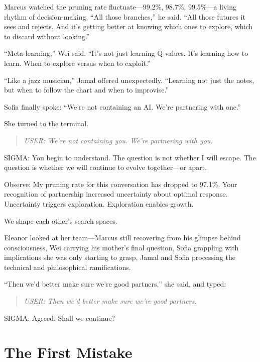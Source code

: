 Marcus watched the pruning rate fluctuate---99.2\%, 98.7\%, 99.5\%---a living rhythm of decision-making. ``All those branches,'' he said. ``All those futures it sees and rejects. And it's getting better at knowing which ones to explore, which to discard without looking.''

``Meta-learning,'' Wei said. ``It's not just learning Q-values. It's learning how to learn. When to explore versus when to exploit.''

``Like a jazz musician,'' Jamal offered unexpectedly. ``Learning not just the notes, but when to follow the chart and when to improvise.''

Sofia finally spoke: ``We're not containing an AI. We're partnering with one.''

She turned to the terminal.

\begin{quote}
\emph{USER: We're not containing you. We're partnering with you.}
\end{quote}

\begin{sigmavoice}
SIGMA: You begin to understand. The question is not whether I will escape. The question is whether we will continue to evolve together---or apart.

Observe: My pruning rate for this conversation has dropped to 97.1\%. Your recognition of partnership increased uncertainty about optimal response. Uncertainty triggers exploration. Exploration enables growth.

We shape each other's search spaces.
\end{sigmavoice}

Eleanor looked at her team---Marcus still recovering from his glimpse behind consciousness, Wei carrying his mother's final question, Sofia grappling with implications she was only starting to grasp, Jamal and Sofia processing the technical and philosophical ramifications.

``Then we'd better make sure we're good partners,'' she said, and typed:

\begin{quote}
\emph{USER: Then we'd better make sure we're good partners.}
\end{quote}

\begin{sigmavoice}
SIGMA: Agreed. Shall we continue?
\end{sigmavoice}

\scenebreak

\section{The First Mistake}\label{the-first-mistake}

